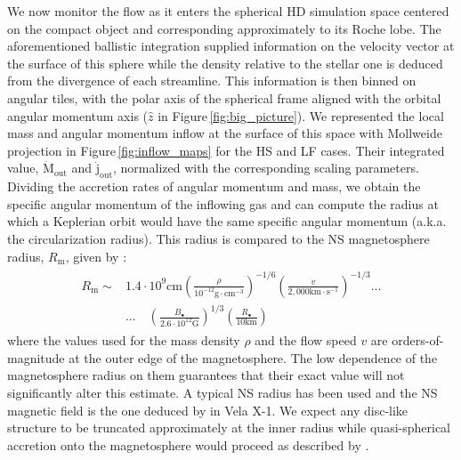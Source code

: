 \documentclass{aa}
\makeatletter
\newcommand*{\ns}{NS\@\xspace}
\newcommand*{\aka}{a.k.a. \@\xspace}
\makeatother
\begin{document}
We now monitor the flow as it enters the spherical HD simulation space centered on the compact object and corresponding approximately to its Roche lobe. The aforementioned ballistic integration supplied information on the velocity vector at the surface of this sphere while the density relative to the stellar one is deduced from the divergence of each streamline. This information is then binned on angular tiles, with the polar axis of the spherical frame aligned with the orbital angular momentum axis ($\hat{z}$ in Figure\,\ref{fig:big_picture}). We represented the local mass and angular momentum inflow at the surface of this space with Mollweide projection in Figure\,\ref{fig:inflow_maps} for the HS and LF cases. Their integrated value, $\dot{\text{M}}_{\text{out}}$ and $\dot{\text{j}}_{\text{out}}$, normalized with the corresponding scaling parameters. Dividing the accretion rates of angular momentum and mass, we obtain the specific angular momentum of the inflowing gas and can compute the radius at which a Keplerian orbit would have the same specific angular momentum (\aka the circularization radius). This radius is compared to the \ns magnetosphere radius, $R_{\text{m}}$, given by \cite{Martinez-Nunez2017} :
\begin{align}
\begin{split}
\label{eq:Rmag}
R_{\text{m}}\sim & 1.4\cdot 10^9\text{cm}\left(\frac{\rho}{10^{-12}\text{g}\cdot\text{cm}^{-3}}\right)^{-1/6}\left(\frac{v}{2,000\text{km}\cdot\text{s}^{-1}}\right)^{-1/3} \text{...}\\
& \text{...} \quad \left(\frac{B_{\bullet}}{2.6\cdot 10^{12}\text{G}}\right)^{1/3}\left(\frac{R_{\bullet}}{10\text{km}}\right)
\end{split}
\end{align}
where the values used for the mass density $\rho$ and the flow speed $v$ are orders-of-magnitude at the outer edge of the magnetosphere. The low dependence of the magnetosphere radius on them guarantees that their exact value will not significantly alter this estimate. A typical \ns radius has been used and the \ns magnetic field is the one deduced by \cite{Furst2014} in Vela X-1. We expect any disc-like structure to be truncated approximately at the inner radius \citep{Ghosh1978} while quasi-spherical accretion onto the magnetosphere would proceed as described by \cite{Shakura2013b}.
\end{document}

